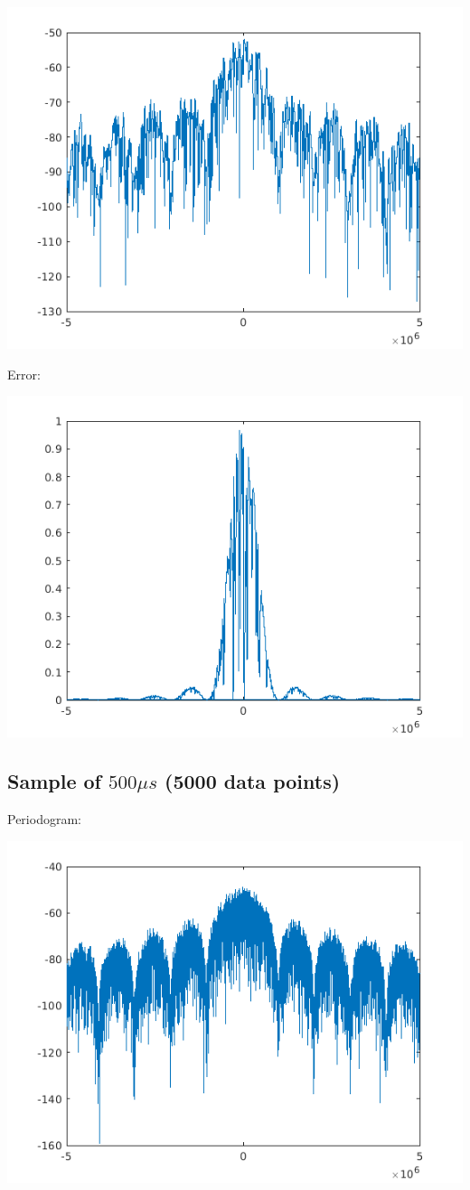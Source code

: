 \documentclass[conference,9pt]{IEEEtran}
\begin{document}
\includegraphics[scale=0.6]{perio500.png}

Error:

\includegraphics[scale=0.6]{error50.png}

\subsection{Sample of $500\mu s$ (5000 data points)}

Periodogram:

\includegraphics[scale=0.5]{b1}
\end{document}
